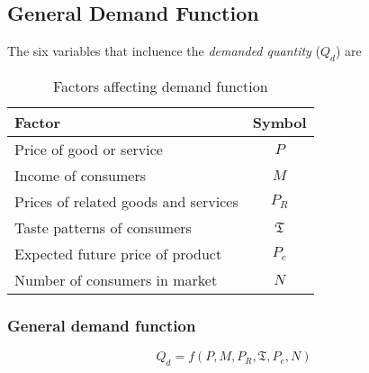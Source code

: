 \documentclass[oneside]{book}
\begin{document}
\subsection{General Demand Function}
The six variables that incluence the \textit{demanded quantity} ($Q_d$) are
\begin{table}[h]
	\centering
	\begin{tabular}{|lc|}
		\hline
		\textbf{Factor}                      & \textbf{Symbol}  \\
		\hline
		Price of good or service             & \(P\)            \\
		Income of consumers                  & \(M\)            \\
		Prices of related goods and services & \(P_R\)          \\
		Taste patterns of consumers          & \(\mathfrak{T}\) \\
		Expected future price of product     & \(P_e\)          \\
		Number of consumers in market        & \(N\)            \\
		\hline
	\end{tabular}
	\caption{Factors affecting demand function}
\end{table}
\subsubsection{General demand function}
\[
	Q_d = f(P, M, P_R, \mathfrak{T}, P_e ,N)
\]
\end{document}
